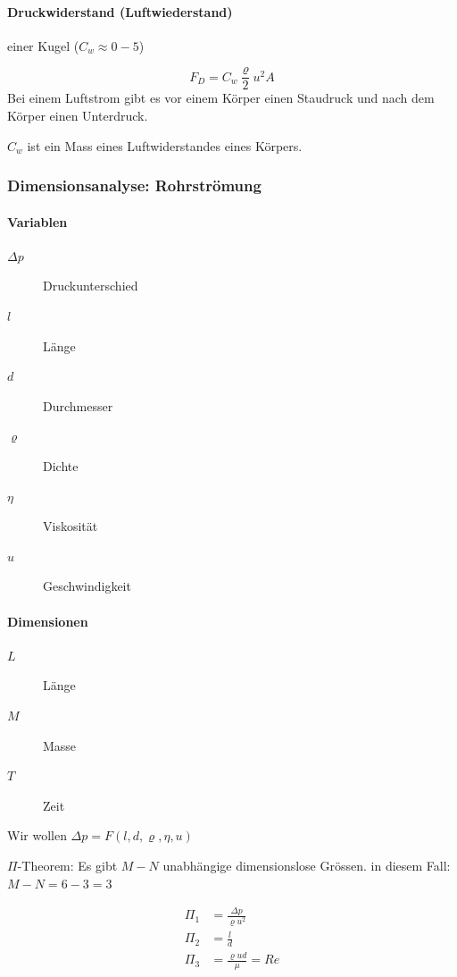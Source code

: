 \documentclass[a4paper]{scrartcl}
\begin{document}
\paragraph{Druckwiderstand (Luftwiederstand)} einer Kugel ($C_w \approx 0-5$)

\[
	F_D = C_w \frac{\varrho}{2} u^2 A
\]
Bei einem Luftstrom gibt es vor einem Körper einen Staudruck und nach dem Körper einen Unterdruck.


$C_w$ ist ein Mass eines Luftwiderstandes eines Körpers.


\subsubsection{Dimensionsanalyse: Rohrströmung}
\paragraph{Variablen}
\begin{description}
	
\item[$\Delta p$] Druckunterschied
\item[$l$] Länge
\item[$d$] Durchmesser
\item[$\varrho$] Dichte
\item[$\eta$] Viskosität
\item[$u$] Geschwindigkeit
\end{description}

\paragraph{Dimensionen}
\begin{description}
	\item[$L$] Länge
	\item[$M$] Masse
	\item[$T$] Zeit
\end{description}

Wir wollen $\Delta p = F(l, d, \varrho, \eta, u)$


$\Pi$-Theorem: Es gibt $M-N$ unabhängige dimensionslose Grössen. in diesem Fall: $M-N = 6-3 = 3$

\begin{align*}
\Pi_1 &= \frac{\Delta p}{\varrho u^2} \\
\Pi_2 &= \frac{l}{d} \\
\Pi_3 &= \frac{\varrho u d}{\mu} = Re
\end{align*}
\end{document}
